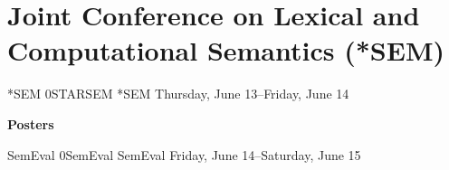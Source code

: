 \chapter{Joint Conference on Lexical and Computational Semantics (*SEM)}
\thispagestyle{emptyheader}

\cleardoublepage

\clearpage


\clearpage
\begin{wsschedule}
{*SEM}
{0}{STARSEM}
{*SEM}
{Thursday, June 13--Friday, June 14}{\SSemLoc}

\end{wsschedule}

\clearpage



\clearpage
\par\centerline{\bfseries\large Posters}\vspace{1em}\par


\clearpage
\begin{wsschedule}
{SemEval}
{0}{SemEval}
{SemEval}
{Friday, June 14--Saturday, June 15}{\SemEvalLoc}

\end{wsschedule}
